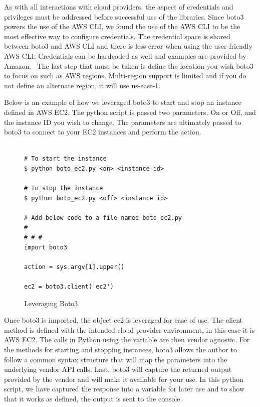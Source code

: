 As with all interactions with cloud providers, the aspect of credentials and
privileges must be addressed before successful use of the libraries. Since
boto3
powers the use of the AWS CLI, we found the use of the AWS CLI to be the most
effective way to configure credentials. The credential space is shared between
boto3 and AWS CLI and there is less error when using the user-friendly AWS CLI.
Credentials can be hardcoded as well and examples are provided by
Amazon.~\cite{hid-sp18-518-Boto3} The last step that must be taken is define
the
location you wish boto3 to focus on such as AWS regions. Multi-region support
is
limited and if you do not define an alternate region, it will use us-east-1.

Below is an example of how we leveraged boto3 to start and stop an instance
defined in AWS EC2. The python script is passed two parameters, On or Off, and
the instance ID you wish to change. The parameters are ultimately passed to
boto3 to connect to your EC2 instances and perform the action.

\begin{figure}[htb]
\begin{verbatim}

# To start the instance
$ python boto_ec2.py <on> <instance id>

# To stop the instance
$ python boto_ec2.py <off> <instance id>

# Add below code to a file named boto_ec2.py
# 
# # # 
import boto3

action = sys.argv[1].upper()

ec2 = boto3.client('ec2')

\end{verbatim}

\caption{Leveraging Boto3~\cite{hid-sp18-518-Boto3}}\label{c:boto3-example}

\end{figure}

Once boto3 is imported, the object ec2 is leveraged for ease of use. The client
method is defined with the intended cloud provider environment, in this case it
is AWS EC2. The calls in Python using the variable are then vendor agnostic.
For
the methods for starting and stopping instances, boto3 allows the author to
follow a common syntax structure that will map the parameters into the
underlying vendor API calls. Last, boto3 will capture the returned output
provided by the vendor and will make it available for your use. In this python
script, we have captured the response into a variable for later use and to show
that it works as defined, the output is sent to the console.

